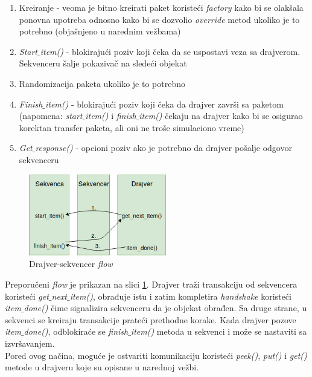\begin{enumerate}
\item Kreiranje - veoma je bitno kreirati paket koristeći \emph{factory} kako bi
  se olakšala ponovna upotreba odnosno kako bi se dozvolio \emph{override} metod
  ukoliko je to potrebno (objašnjeno u narednim vežbama)
\item \emph{Start\(\_\)item()} - blokirajući poziv koji čeka da se uspostavi
  veza sa drajverom. Sekvenceru šalje pokazivač na sledeći objekat
\item Randomizacija paketa ukoliko je to potrebno
\item \emph{Finish\(\_\)item()} - blokirajući poziv koji čeka da drajver završi
  sa paketom (napomena: \emph{start\(\_\)item()} i \emph{finish\(\_\)item()}
  čekaju na drajver kako bi se osigurao korektan transfer paketa, ali oni ne
  troše simulaciono vreme)
\item \emph{Get\(\_\)response()} - opcioni poziv ako je potrebno da drajver
  pošalje odgovor sekvenceru
\end{enumerate}

\begin{figure}[h!]
  \centering
  \includegraphics[width=60mm, scale=0.5]{img/v6_drv_seq_flow.png}
  \caption{Drajver-sekvencer \emph{flow}}
  \label{fig:drv_seq_flow}
\end{figure}

Preporučeni \emph{flow} je prikazan na slici \ref{fig:drv_seq_flow}. Drajver
traži transakciju od sekvencera koristeći \emph{get\(\_\)next\(\_\)item()},
obrađuje istu i zatim kompletira \emph{handshake} koristeći
\emph{item\(\_\)done()} čime signalizira sekvenceru da je objekat obrađen. Sa
druge strane, u sekvenci se kreiraju transakcije prateći prethodne korake. Kada
drajver pozove \emph{item\(\_\)done()}, odblokiraće se \emph{finish\(\_\)item()}
metoda u sekvenci i može se nastaviti sa izvršavanjem.\\

Pored ovog načina, moguće je ostvariti komunikaciju koristeći \emph{peek()},
\emph{put()} i \emph{get()} metode u drajveru koje su opisane u narednoj vežbi.\\

